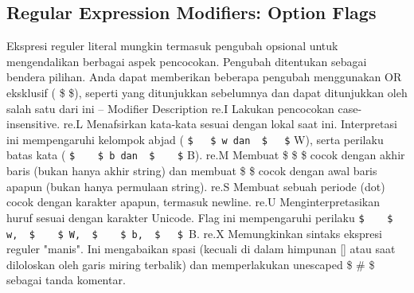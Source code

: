 \begin {enumerate}
\begin {enumerate}
\subsection{Regular Expression Modifiers: Option Flags}
Ekspresi reguler literal mungkin termasuk pengubah opsional untuk mengendalikan berbagai aspek pencocokan. Pengubah ditentukan sebagai bendera pilihan. Anda dapat memberikan beberapa pengubah menggunakan OR eksklusif ( \$   \$), seperti yang ditunjukkan sebelumnya dan dapat ditunjukkan oleh salah satu dari ini – Modifier Description
re.I
Lakukan pencocokan case-insensitive.
re.L
Menafsirkan kata-kata sesuai dengan lokal saat ini. Interpretasi ini mempengaruhi kelompok abjad ( \verb|$   $ w dan  $   $| W), serta perilaku batas kata ( \verb|$    $ b dan  $    $| B).
re.M
Membuat  \$  \$  \$ cocok dengan akhir baris (bukan hanya akhir string) dan membuat  \$   \$ cocok dengan awal baris apapun (bukan hanya permulaan string).
re.S
Membuat sebuah periode (dot) cocok dengan karakter apapun, termasuk newline.
re.U
Menginterpretasikan huruf sesuai dengan karakter Unicode. Flag ini mempengaruhi perilaku  \verb|$    $ w,  $    $ W,  $    $ b,  $   $ |B.
re.X
Memungkinkan sintaks ekspresi reguler "manis". Ini mengabaikan spasi (kecuali di dalam himpunan [] atau saat diloloskan oleh garis miring terbalik) dan memperlakukan unescaped  \$  \#  \$ sebagai tanda komentar.

\end{enumerate}
\end{enumerate}
